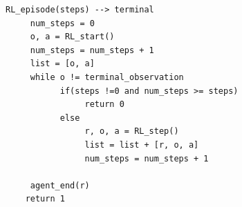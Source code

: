\documentclass[11pt]{article}
\begin{document}
\begin{verbatim}
RL_episode(steps) --> terminal
     num_steps = 0
     o, a = RL_start()
     num_steps = num_steps + 1
     list = [o, a]
     while o != terminal_observation
           if(steps !=0 and num_steps >= steps)
                return 0
           else
                r, o, a = RL_step()
                list = list + [r, o, a]
                num_steps = num_steps + 1
           
     agent_end(r)
	return 1
\end{verbatim}
% 
\end{document}
